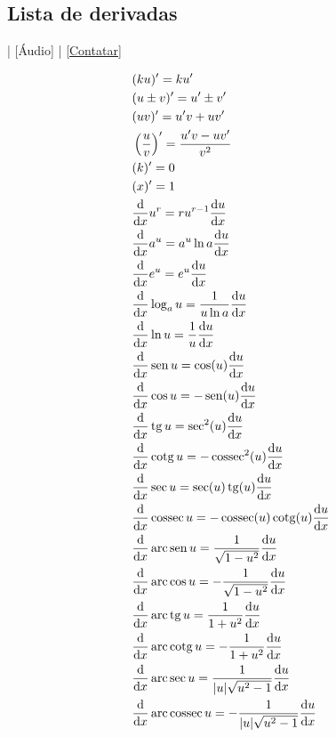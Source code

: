 \subsection{Lista de derivadas}\label{deriv_tabela_de_derivadas}

\begin{flushright}
  [Vídeo] | [Áudio] | \href{https://phkonzen.github.io/notas/contato.html}{[Contatar]}
\end{flushright}

\begin{align}
  & (ku)' = ku' \\
  & (u\pm v)' = u' \pm v'\\
  & (uv)' = u'v + uv' \\
  & \left(\frac{u}{v}\right)' = \frac{u'v - uv'}{v^2} \\
  & (k)' = 0 \\
  & (x)' = 1 \\
  & \frac{\mathrm{d}}{\mathrm{d} x}u^r = ru^{r-1}\frac{\mathrm{d} u}{\mathrm{d} x}\\
  & \frac{\mathrm{d}}{\mathrm{d} x}a^u = a^u\ln a\frac{\mathrm{d} u}{\mathrm{d} x} \\
  & \frac{\mathrm{d}}{\mathrm{d} x}e^u = e^u\frac{\mathrm{d} u}{\mathrm{d} x} \\
  & \frac{\mathrm{d}}{\mathrm{d} x}\log_a u = \frac{1}{u\ln a}\frac{\mathrm{d} u}{\mathrm{d} x} \\
  & \frac{\mathrm{d}}{\mathrm{d} x}\ln u = \frac{1}{u}\frac{\mathrm{d} u}{\mathrm{d} x} \\
  & \frac{\mathrm{d}}{\mathrm{d} x}\operatorname{sen} u = \cos(u)\frac{\mathrm{d} u}{\mathrm{d} x} \\
  & \frac{\mathrm{d}}{\mathrm{d} x}\cos u = - \operatorname{sen}(u)\frac{\mathrm{d} u}{\mathrm{d} x}\\
  & \frac{\mathrm{d}}{\mathrm{d} x}\operatorname{tg} u = \sec^2(u)\frac{\mathrm{d} u}{\mathrm{d} x} \\
  & \frac{\mathrm{d}}{\mathrm{d} x}\operatorname{cotg} u = -\operatorname{cossec}^2(u)\frac{\mathrm{d} u}{\mathrm{d} x} \\
  & \frac{\mathrm{d}}{\mathrm{d} x}\sec u = \sec(u)\operatorname{tg}(u)\frac{\mathrm{d} u}{\mathrm{d} x} \\
  & \frac{\mathrm{d}}{\mathrm{d} x}\operatorname{cossec} u = -\operatorname{cossec}(u)\operatorname{cotg}(u)\frac{\mathrm{d} u}{\mathrm{d} x} \\
  &\frac{\mathrm{d}}{\mathrm{d} x}\operatorname{arc}\operatorname{sen} u = \frac{1}{\sqrt{1-u^2}}\frac{\mathrm{d} u}{\mathrm{d} x} \\
  & \frac{\mathrm{d}}{\mathrm{d} x}\operatorname{arc}\cos u = -\frac{1}{\sqrt{1-u^2}}\frac{\mathrm{d} u}{\mathrm{d} x} \\
  &\frac{\mathrm{d}}{\mathrm{d} x}\operatorname{arc}\operatorname{tg} u = \frac{1}{1+u^2}\frac{\mathrm{d} u}{\mathrm{d} x} \\
  & \frac{\mathrm{d}}{\mathrm{d} x}\operatorname{arc}\operatorname{cotg} u = -\frac{1}{1+u^2}\frac{\mathrm{d} u}{\mathrm{d} x} \\
  &\frac{\mathrm{d}}{\mathrm{d} x}\operatorname{arc}\sec u = \frac{1}{|u|\sqrt{u^2-1}}\frac{\mathrm{d} u}{\mathrm{d} x} \\
  & \frac{\mathrm{d}}{\mathrm{d} x}\operatorname{arc}\operatorname{cossec} u = -\frac{1}{|u|\sqrt{u^2-1}}\frac{\mathrm{d} u}{\mathrm{d} x}
\end{align}

